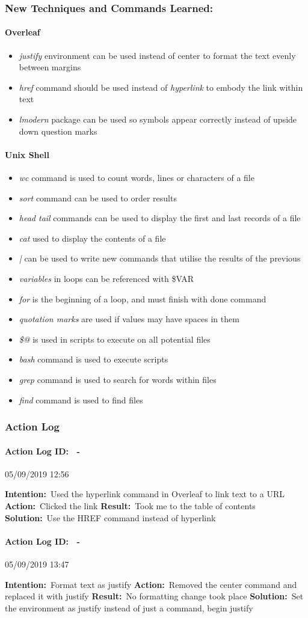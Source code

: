 \documentclass[12pt]{article}
\newcounter{problem} \setcounter{problem}{1}
\newcommand{\actionlog}[1]{\paragraph{Action Log ID: \theproblem\ -}{#1} ~\\ \addtocounter{problem}{1}}
\newcommand{\intention}[1]{\textbf{Intention:}{\textnormal\ #1} \newline}
\newcommand{\action}[1]{\textbf{Action:}{\textnormal\ #1} \newline}
\newcommand{\result}[1]{\textbf{Result:}{\textnormal\ #1} \newline}
\newcommand{\solution}[1]{\textbf{Solution:}{\textnormal\ #1} \newline}
\newcommand{\learning}[2]{\item \textit{#1} \textnormal{#2}}
\begin{document}
\subsubsection{New Techniques and Commands Learned:}

\paragraph{Overleaf}
\begin{itemize}
\learning{justify}{environment can be used instead of center to format the text evenly between margins}
\learning{href}{command should be used instead of \textit{hyperlink} to embody the link within text}
\learning{lmodern}{package can be used so symbols appear correctly instead of upside down question marks}
\end{itemize}
\paragraph{Unix Shell}
\begin{itemize}
\learning{wc}{command is used to count words, lines or characters of a file}
\learning{sort}{command can be used to order results}
\learning{head tail}{commands can be used to display the first and last records of a file}
\learning{cat}{used to display the contents of a file}
\learning{|}{can be used to write new commands that utilise the results of the previous}
\learning{variables}{in loops can be referenced with \$VAR}
\learning{for}{is the beginning of a loop, and must finish with done command}
\learning{quotation marks}{are used if values may have spaces in them}
\learning{\$@}{is used in scripts to execute on all potential files}
\learning{bash}{command is used to execute scripts}
\learning{grep}{command is used to search for words within files}
\learning{find}{command is used to find files}
\end{itemize}

\subsubsection{Action Log}
\actionlog{05/09/2019 12:56}
\intention{Used the hyperlink command in Overleaf to link text to a URL}
\action{Clicked the link}
\result{Took me to the table of contents}
\solution{Use the HREF command instead of hyperlink}

\actionlog{05/09/2019 13:47}
\intention{Format text as justify}
\action{Removed the center command and replaced it with justify}
\result{No formatting change took place}
\solution{Set the environment as justify instead of just a command, begin justify}
\end{document}

